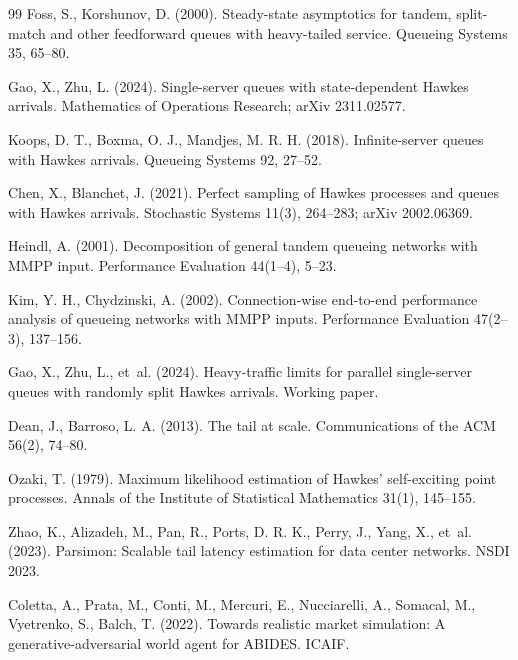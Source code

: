 \documentclass[11pt]{article}
\begin{document}
\begin{thebibliography}{99}
Foss, S., Korshunov, D. (2000).
Steady-state asymptotics for tandem, split-match and other feedforward queues with heavy-tailed service.
Queueing Systems 35, 65--80.

Gao, X., Zhu, L. (2024).
Single-server queues with state-dependent Hawkes arrivals.
Mathematics of Operations Research; arXiv 2311.02577.

Koops, D. T., Boxma, O. J., Mandjes, M. R. H. (2018).
Infinite-server queues with Hawkes arrivals.
Queueing Systems 92, 27--52.

Chen, X., Blanchet, J. (2021).
Perfect sampling of Hawkes processes and queues with Hawkes arrivals.
Stochastic Systems 11(3), 264--283; arXiv 2002.06369.

Heindl, A. (2001).
Decomposition of general tandem queueing networks with MMPP input.
Performance Evaluation 44(1--4), 5--23.

Kim, Y. H., Chydzinski, A. (2002).
Connection-wise end-to-end performance analysis of queueing networks with MMPP inputs.
Performance Evaluation 47(2--3), 137--156.

Gao, X., Zhu, L., et~al. (2024).
Heavy-traffic limits for parallel single-server queues with randomly split Hawkes arrivals.
Working paper.

Dean, J., Barroso, L. A. (2013).
The tail at scale.
Communications of the ACM 56(2), 74--80.

Ozaki, T. (1979).
Maximum likelihood estimation of Hawkes' self-exciting point processes.
Annals of the Institute of Statistical Mathematics 31(1), 145--155.

Zhao, K., Alizadeh, M., Pan, R., Ports, D. R. K., Perry, J., Yang, X., et~al. (2023).
Parsimon: Scalable tail latency estimation for data center networks.
NSDI 2023.

Coletta, A., Prata, M., Conti, M., Mercuri, E., Nucciarelli, A., Somacal, M., Vyetrenko, S., Balch, T. (2022).
Towards realistic market simulation: A generative-adversarial world agent for ABIDES.
ICAIF.


\end{thebibliography}
\end{document}
